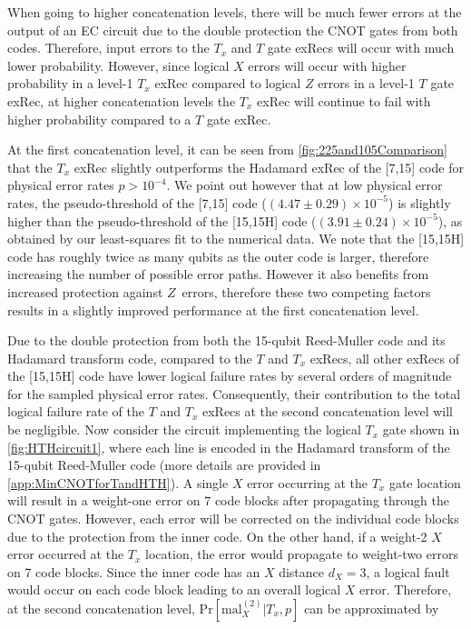 \documentclass[pra,longbibliography,twocolumn,showpacs,nofootinbib,superscriptaddress,notitlepage]{revtex4-1}
\begin{document}
When going to higher concatenation levels, there will be much fewer errors at the output of an EC circuit due to the double protection the CNOT gates from both codes. Therefore, input errors to the $T_{x}$ and $T$ gate exRecs will occur with much lower probability. However, since logical $X$ errors will occur with higher probability in a level-1 $T_{x}$ exRec compared to logical $Z$ errors in a level-1 $T$ gate exRec, at higher concatenation levels the $T_{x}$ exRec will continue to fail with higher probability compared to a $T$ gate exRec.

At the first concatenation level, it can be seen from \cref{fig:225and105Comparison} that the $T_{x}$ exRec slightly outperforms the Hadamard exRec of the [7,15] code for physical error rates $p > 10^{-4}$. We point out however that at low physical error rates, the pseudo-threshold of the [7,15] code ($(4.47 \pm 0.29) \times 10^{-5}$) is slightly higher than the pseudo-threshold of the [15,15H] code ($(3.91 \pm 0.24) \times 10^{-5}$), as obtained by our least-squares fit to the numerical data. We note that the [15,15H] code has roughly twice as many qubits as the outer code is larger, therefore increasing the number of possible error paths. However it also benefits from increased protection against $Z$~errors, therefore these two competing factors results in a slightly improved performance at the first concatenation level.

Due to the double protection from both the 15-qubit Reed-Muller code and its Hadamard transform code, compared to the $T$ and $T_{x}$ exRecs, all other exRecs of the [15,15H] code have lower logical failure rates by several orders of magnitude for the sampled physical error rates. Consequently, their contribution to the total logical failure rate of the $T$ and $T_{x}$ exRecs at the second concatenation level will be negligible. Now consider the circuit implementing the logical $T_{x}$ gate shown in \cref{fig:HTHcircuit1}, where each line is encoded in the Hadamard transform of the 15-qubit Reed-Muller code (more details are provided in \cref{app:MinCNOTforTandHTH}). A single $X$ error occurring at the $T_{x}$ gate location will result in a weight-one error on 7 code blocks after propagating through the CNOT gates. However, each error will be corrected on the individual code blocks due to the protection from the inner code. On the other hand, if a weight-2 $X$ error occurred at the $T_{x}$ location, the error would propagate to weight-two errors on 7 code blocks. Since the inner code has an $X$ distance $d_{X} = 3$, a logical fault would occur on each code block leading to an overall logical $X$ error. Therefore, at the second concatenation level, $\mathrm{Pr}[\mathrm{mal}^{(2)}_{X}|T_{x},p]$ can be approximated by
\end{document}
